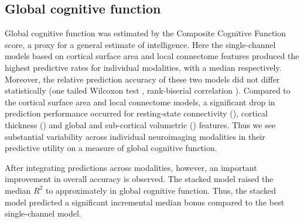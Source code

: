 \documentclass[10pt,letterpaper]{article}
\begin{document}
\subsection*{Global cognitive function}

Global cognitive function was estimated by the Composite Cognitive Function score, a proxy for a general estimate of intelligence. Here the single-channel models based on cortical surface area and local connectome features produced the highest predictive rates for individual modalities, with a median  respectively. Moreover, the relative prediction accuracy of these two models did not differ statistically (one tailed Wilcoxon test , rank-biserial correlation ). Compared to the cortical surface area and local connectome models, a significant drop in prediction performance occurred for resting-state connectivity (), cortical thickness () and global and sub-cortical volumetric () features. Thus we see substantial variability across individual neuroimaging modalities in their predictive utility on a measure of global cognitive function. 

After integrating predictions across modalities, however, an important improvement in overall accuracy is observed. The stacked model raised the median $R^2$ to approximately  in global cognitive function. Thus, the stacked model predicted a significant incremental median bonus  compared to the best single-channel model. 
\end{document}

